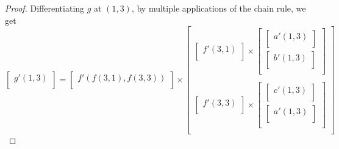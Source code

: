 \documentclass{article}
\theoremstyle{plain} %
\numberwithin{thm}{section} %
\theoremstyle{definition}
\begin{document}
\begin{proof}
            Differentiating \(g\) at \((1,3)\), by multiple applications of the chain rule, we get
            \[
                \begin{bmatrix}
                    g'(1,3) \\
                \end{bmatrix}
                = \begin{bmatrix}
                    f'(f(3,1),f(3,3)) \\
                \end{bmatrix}
                \times \begin{bmatrix}
                    \begin{bmatrix}
                        f'(3,1) \\
                    \end{bmatrix}
                    \times 
                    \begin{bmatrix}
                        \begin{bmatrix}
                            a'(1,3) \\
                        \end{bmatrix} \\
                        \begin{bmatrix}
                            b'(1,3) \\
                        \end{bmatrix}\\
                    \end{bmatrix} \\
                    \\
                    \begin{bmatrix}
                        f'(3, 3) \\
                    \end{bmatrix}
                    \times 
                    \begin{bmatrix}
                        \begin{bmatrix}
                            c'(1,3) \\
                        \end{bmatrix} \\
                        \begin{bmatrix}
                            a'(1,3) \\
                        \end{bmatrix} \\
                    \end{bmatrix} \\

\end{bmatrix}\]
\end{proof}
\end{document}
